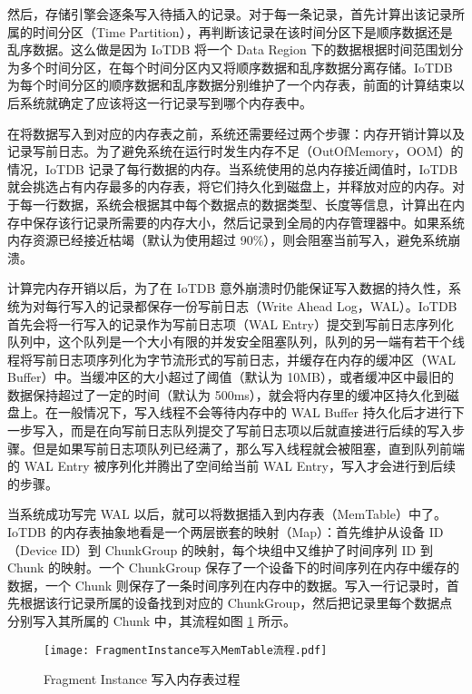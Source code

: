 然后，存储引擎会逐条写入待插入的记录。对于每一条记录，首先计算出该记录所属的时间分区（Time Partition），再判断该记录在该时间分区下是顺序数据还是乱序数据。这么做是因为 IoTDB 将一个 Data Region 下的数据根据时间范围划分为多个时间分区，在每个时间分区内又将顺序数据和乱序数据分离存储。IoTDB 为每个时间分区的顺序数据和乱序数据分别维护了一个内存表，前面的计算结束以后系统就确定了应该将这一行记录写到哪个内存表中。

在将数据写入到对应的内存表之前，系统还需要经过两个步骤：内存开销计算以及记录写前日志。为了避免系统在运行时发生内存不足（OutOfMemory，OOM）的情况，IoTDB 记录了每行数据的内存。当系统使用的总内存接近阈值时，IoTDB 就会挑选占有内存最多的内存表，将它们持久化到磁盘上，并释放对应的内存。对于每一行数据，系统会根据其中每个数据点的数据类型、长度等信息，计算出在内存中保存该行记录所需要的内存大小，然后记录到全局的内存管理器中。如果系统内存资源已经接近枯竭（默认为使用超过 90\%），则会阻塞当前写入，避免系统崩溃。

计算完内存开销以后，为了在 IoTDB 意外崩溃时仍能保证写入数据的持久性，系统为对每行写入的记录都保存一份写前日志（Write Ahead Log，WAL）。IoTDB 首先会将一行写入的记录作为写前日志项（WAL Entry）提交到写前日志序列化队列中，这个队列是一个大小有限的并发安全阻塞队列，队列的另一端有若干个线程将写前日志项序列化为字节流形式的写前日志，并缓存在内存的缓冲区（WAL Buffer）中。当缓冲区的大小超过了阈值（默认为 10MB），或者缓冲区中最旧的数据保持超过了一定的时间（默认为 500ms），就会将内存里的缓冲区持久化到磁盘上\cite{朱海铭2023面向内存表的可动态配置预写日志框架}。在一般情况下，写入线程不会等待内存中的 WAL Buffer 持久化后才进行下一步写入，而是在向写前日志队列提交了写前日志项以后就直接进行后续的写入步骤。但是如果写前日志项队列已经满了，那么写入线程就会被阻塞，直到队列前端的 WAL Entry 被序列化并腾出了空间给当前 WAL Entry，写入才会进行到后续的步骤。

当系统成功写完 WAL 以后，就可以将数据插入到内存表（MemTable）中了。IoTDB 的内存表抽象地看是一个两层嵌套的映射（Map）：首先维护从设备 ID（Device ID）到 ChunkGroup 的映射，每个块组中又维护了时间序列 ID 到 Chunk 的映射。一个 ChunkGroup 保存了一个设备下的时间序列在内存中缓存的数据，一个 Chunk 则保存了一条时间序列在内存中的数据。写入一行记录时，首先根据该行记录所属的设备找到对应的 ChunkGroup，然后把记录里每个数据点分别写入其所属的 Chunk 中，其流程如图 \ref{fig:fragment-instance-insert-to-memtable} 所示。

\begin{figure}
  \centering
  \texttt{[image: FragmentInstance写入MemTable流程.pdf]}
  \caption{Fragment Instance 写入内存表过程}
  \label{fig:fragment-instance-insert-to-memtable}
\end{figure}

